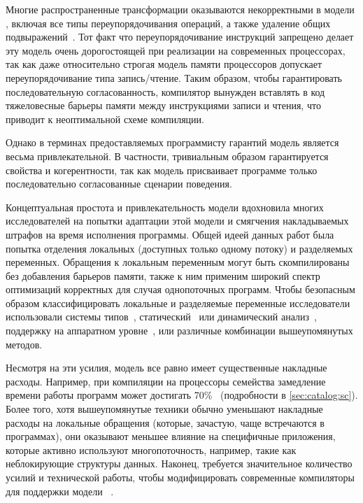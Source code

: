 Многие распространенные трансформации оказываются 
некорректными в модели \SC, включая 
все типы переупорядочивания операций, 
а также удаление общих подвыражений~\cite{Marino-al:PLDI11, Sevcik-Aspinall:ECOOP08}.
Тот факт что переупорядочивание инструкций запрещено 
делает эту модель очень дорогостоящей при реализации
на современных процессорах, так как даже 
относительно строгая модель памяти процессоров \Intel
допускает переупорядочивание типа запись/чтение. 
Таким образом, чтобы гарантировать последовательную согласованность, 
компилятор вынужден вставлять в код тяжеловесные 
барьеры памяти между инструкциями записи и чтения,
что приводит к неоптимальной схеме компиляции. 

Однако в терминах предоставляемых программисту гарантий 
модель \SC является весьма привлекательной. 
В частности, тривиальным образом гарантируется свойства \eDRF и когерентности, 
так как модель присваивает программе только 
последовательно согласованные сценарии поведения. 

Концептуальная простота и привлекательность модели \SC 
вдохновила многих исследователей на попытки 
адаптации этой модели и смягчения накладываемых 
штрафов на время исполнения программы. 
Общей идеей данных работ была попытка 
отделения локальных (доступных только одному потоку) 
и разделяемых переменных.
Обращения к локальным переменным могут быть скомпилированы 
без добавления барьеров памяти, также к ним 
применим широкий спектр оптимизаций корректных 
для случая однопоточных программ. 
Чтобы безопасным образом классифицировать 
локальные и разделяемые переменные исследователи 
использовали системы типов~\cite{Vollmer-al:PPoPP17},
статический~\cite{Singh-al:ISCA12} или динамический анализ~\cite{Liu-al:PLDI19}, 
поддержку на аппаратном уровне~\cite{Singh-al:ISCA12, Marino-al:PLDI10}, 
или различные комбинации вышеупомянутых методов.  

Несмотря на эти усилия, модель \SC все равно имеет существенные накладные расходы. 
Например, при компиляции на процессоры семейства 
замедление времени работы программ может достигать 70\%~\cite{Liu-al:PLDI19} 
(\see подробности в \cref{sec:catalog:sc}).
Более того, хотя вышеупомянутые техники обычно уменьшают 
накладные расходы на локальные обращения 
(которые, зачастую, чаще встречаются в программах),
они оказывают меньшее влияние на специфичные приложения, 
которые активно используют многопоточность, 
например, такие как неблокирующие структуры данных.
Наконец, требуется значительное количество усилий 
и технической работы, чтобы модифицировать 
современные компиляторы для поддержки модели \SC~\cite{Marino-al:PLDI11, Liu-al:PLDI19}.

